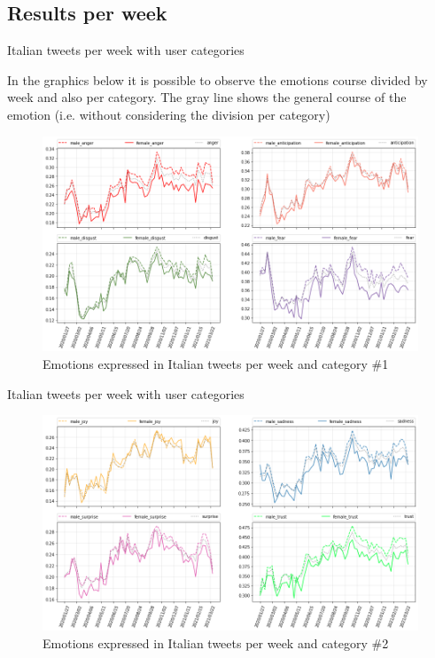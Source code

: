 \documentclass[8pt]{beamer}  %
\begin{document}
\subsection{Results per week}

\begin{frame}{Italian tweets per week with user categories}

	In the graphics below it is possible to observe the emotions course divided by week and also per category. The gray line shows the general course of the emotion (i.e. without considering the division per category) 
	
	\begin{figure}[h]
    	\includegraphics[scale=.30]{assets/img/it_emotions_per_category_wrt_total_subplots_1.png}
    	\caption{Emotions expressed in Italian tweets per week and category \#1}
    	\label{fig:it_emotion_weekly_per_category_subplot_1}
    \end{figure}
	
\end{frame}

\begin{frame}{Italian tweets per week with user categories} 
	
	\begin{figure}[h]
    	\includegraphics[scale=.30]{assets/img/it_emotions_per_category_wrt_total_subplots_2.png}
    	\caption{Emotions expressed in Italian tweets per week and category \#2}
    	\label{fig:it_emotion_weekly_per_category_subplot_2}
    \end{figure}
	
\end{frame}
\end{document}
